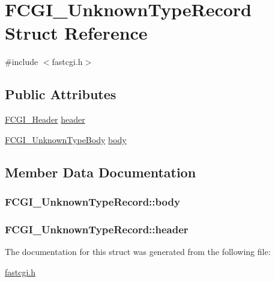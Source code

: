 \hypertarget{structFCGI__UnknownTypeRecord}{\section{F\-C\-G\-I\-\_\-\-Unknown\-Type\-Record Struct Reference}
\label{structFCGI__UnknownTypeRecord}
}


{\ttfamily \#include $<$fastcgi.\-h$>$}

\subsection*{Public Attributes}
\begin{DoxyCompactItemize}
\item 
\hyperlink{structFCGI__Header}{F\-C\-G\-I\-\_\-\-Header} \hyperlink{structFCGI__UnknownTypeRecord_a7f8a737d49902f98ca9355341d052527}{header}
\item 
\hyperlink{structFCGI__UnknownTypeBody}{F\-C\-G\-I\-\_\-\-Unknown\-Type\-Body} \hyperlink{structFCGI__UnknownTypeRecord_af10a54db13198b711f914571ea54323f}{body}
\end{DoxyCompactItemize}


\subsection{Member Data Documentation}
\hypertarget{structFCGI__UnknownTypeRecord_af10a54db13198b711f914571ea54323f}{
\subsubsection[{body}]{ F\-C\-G\-I\-\_\-\-Unknown\-Type\-Record\-::body}}\label{structFCGI__UnknownTypeRecord_af10a54db13198b711f914571ea54323f}
\hypertarget{structFCGI__UnknownTypeRecord_a7f8a737d49902f98ca9355341d052527}{
\subsubsection[{header}]{ F\-C\-G\-I\-\_\-\-Unknown\-Type\-Record\-::header}}\label{structFCGI__UnknownTypeRecord_a7f8a737d49902f98ca9355341d052527}


The documentation for this struct was generated from the following file\-:\begin{DoxyCompactItemize}
\item 
\hyperlink{fastcgi_8h}{fastcgi.\-h}\end{DoxyCompactItemize}
